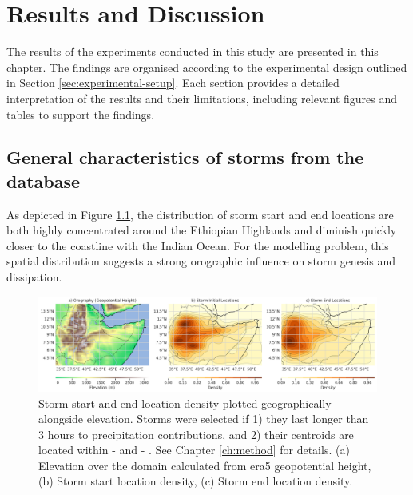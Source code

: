 \chapter{Results and Discussion}
\label{ch:results}

The results of the experiments conducted in this study are presented in this chapter. The findings are organised according to the experimental design outlined in Section \ref{sec:experimental-setup}. Each section provides a detailed interpretation of the results and their limitations, including relevant figures and tables to support the findings.

\section{General characteristics of storms from the database}

As depicted in Figure \ref{fig:orography_storm_init_end_kde}, the distribution of storm start and end locations are both highly concentrated around the Ethiopian Highlands and diminish quickly closer to the coastline with the Indian Ocean. For the modelling problem, this spatial distribution suggests a strong orographic influence on storm genesis and dissipation.

\begin{figure}[ht]
    \centering
    \includegraphics[width=\textwidth]{../figures/generated/exploration/orography_storm_init_end_kde.png}
    \caption{Storm start and end location density plotted geographically alongside elevation. Storms were selected if 1) they last longer than 3 hours to precipitation contributions, and 2) their centroids are located within  -  and  -  \citep{Hill2023}. See Chapter \ref{ch:method} for details. (a) Elevation over the domain calculated from \acrshort{era5} geopotential height, (b) Storm start location density, (c) Storm end location density.}
    \label{fig:orography_storm_init_end_kde}
\end{figure}

